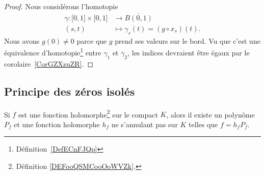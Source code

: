 \begin{proof}
	Nous considérons l'homotopie
	\begin{equation}
		\begin{aligned}
			\gamma\colon \mathopen[ 0 , 1 \mathclose]\times \mathopen[ 0 , 1 \mathclose] & \to \overline{ B(0,1) }              \\
			(s,t)                                                                        & \mapsto \gamma_s(t)=(g\circ x_s)(t).
		\end{aligned}
	\end{equation}
	Nous avons \( g(0)\neq 0\) parce que \( g\) prend ses valeurs sur le bord. Vu que c'est une équivalence d'homotopie\footnote{Définition~\ref{DefECnFJQp}} entre \( \gamma_1\) et \( \gamma_2\), les indices devraient être égaux par le corolaire~\ref{CorGZXzuZR}.
\end{proof}

\subsection{Principe des zéros isolés}

\begin{lemma}   \label{LEMooYYZQooClmOgG}
	Si \( f\) est une fonction holomorphe\footnote{Définition \ref{DEFooQSMCooOoWVZk}.} sur le compact \( K\), alors il existe un polynôme \( P_f\) et une fonction holomorphe \( h_f \) ne s'annulant pas sur \( K\) telles que \( f=h_fP_f \).
\end{lemma}

